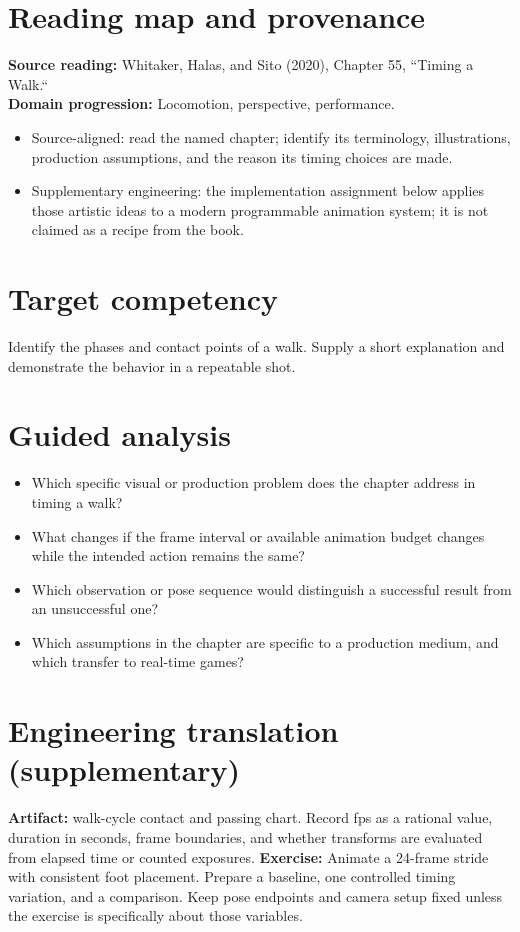 \documentclass[10pt,letterpaper]{article}
\begin{document}
\makedoctitle
\makedocsummary

\section{Reading map and provenance}
\textbf{Source reading:} Whitaker, Halas, and Sito (2020), Chapter 55, ``Timing a Walk.``\\
\textbf{Domain progression:} Locomotion, perspective, performance.
\begin{itemize}
\item Source-aligned: read the named chapter; identify its terminology, illustrations, production assumptions, and the reason its timing choices are made.
\item Supplementary engineering: the implementation assignment below applies those artistic ideas to a modern programmable animation system; it is not claimed as a recipe from the book.
\end{itemize}
\section{Target competency}
Identify the phases and contact points of a walk. Supply a short explanation and demonstrate the behavior in a repeatable shot.
\section{Guided analysis}
\begin{itemize}
\item Which specific visual or production problem does the chapter address in timing a walk?
\item What changes if the frame interval or available animation budget changes while the intended action remains the same?
\item Which observation or pose sequence would distinguish a successful result from an unsuccessful one?
\item Which assumptions in the chapter are specific to a production medium, and which transfer to real-time games?
\end{itemize}
\section{Engineering translation (supplementary)}
\textbf{Artifact:} walk-cycle contact and passing chart. Record fps as a rational value, duration in seconds, frame boundaries, and whether transforms are evaluated from elapsed time or counted exposures.
\textbf{Exercise:} Animate a 24-frame stride with consistent foot placement. Prepare a baseline, one controlled timing variation, and a comparison. Keep pose endpoints and camera setup fixed unless the exercise is specifically about those variables.
\end{document}
